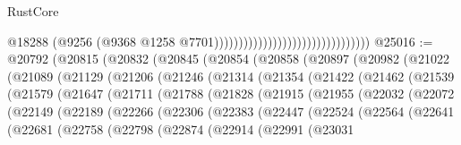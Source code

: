 \begin{lexlean}{RustCore}
\begin{coremodule}
                                                                @18288
                                                                (@9256
                                                                  (@9368
                                                                    @1258
                                                                    @7701))))))))))))))))))))))))))))))))
@25016 := @20792
    (@20815
      (@20832
        (@20845
          (@20854
            (@20858
              (@20897
                (@20982
                  (@21022
                    (@21089
                      (@21129
                        (@21206
                          (@21246
                            (@21314
                              (@21354
                                (@21422
                                  (@21462
                                    (@21539
                                      (@21579
                                        (@21647
                                          (@21711
                                            (@21788
                                              (@21828
                                                (@21915
                                                  (@21955
                                                    (@22032
                                                      (@22072
                                                        (@22149
                                                          (@22189
                                                            (@22266
                                                              (@22306
                                                                (@22383
                                                                  (@22447
                                                                    (@22524
                                                                      (@22564
                                                                        (@22641
                                                                          (@22681
                                                                            (@22758
                                                                              (@22798
                                                                                (@22874
                                                                                  (@22914
                                                                                    (@22991
                                                                                      (@23031

\end{coremodule}
\end{lexlean}
